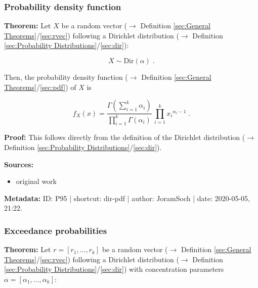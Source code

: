 \documentclass[a4paper,12pt,twoside]{book}
\begin{document}
\subsubsection[\textbf{Probability density function}]{Probability density function} \label{sec:dir-pdf}
\setcounter{equation}{0}

\textbf{Theorem:} Let $X$ be a random vector ($\rightarrow$ Definition \ref{sec:General Theorems}/\ref{sec:rvec}) following a Dirichlet distribution ($\rightarrow$ Definition \ref{sec:Probability Distributions}/\ref{sec:dir}):

\begin{equation} \label{eq:dir-pdf-Dir}
X \sim \mathrm{Dir}(\alpha) \; .
\end{equation}

Then, the probability density function ($\rightarrow$ Definition \ref{sec:General Theorems}/\ref{sec:pdf}) of $X$ is

\begin{equation} \label{eq:dir-pdf-Dir-pdf}
f_X(x) = \frac{\Gamma\left( \sum_{i=1}^k \alpha_i \right)}{\prod_{i=1}^k \Gamma(\alpha_i)} \, \prod_{i=1}^k {x_i}^{\alpha_i-1} \; .
\end{equation}


\vspace{1em}
\textbf{Proof:} This follows directly from the definition of the Dirichlet distribution ($\rightarrow$ Definition \ref{sec:Probability Distributions}/\ref{sec:dir}).


\vspace{1em}
\textbf{Sources:}
\begin{itemize}
\item original work\end{itemize}


\vspace{1em}
\textbf{Metadata:} ID: P95 | shortcut: dir-pdf | author: JoramSoch | date: 2020-05-05, 21:22.
\vspace{1em}



\subsubsection[\textbf{Exceedance probabilities}]{Exceedance probabilities} \label{sec:dir-ep}
\setcounter{equation}{0}

\textbf{Theorem:} Let $r = [r_1, \ldots, r_k]$ be a random vector ($\rightarrow$ Definition \ref{sec:General Theorems}/\ref{sec:rvec}) following a Dirichlet distribution ($\rightarrow$ Definition \ref{sec:Probability Distributions}/\ref{sec:dir}) with concentration parameters $\alpha = [\alpha_1, \ldots, \alpha_k]$:
\end{document}
